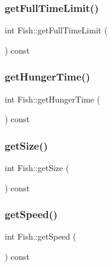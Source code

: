 \mbox{\label{class_fish_a40a7508eeee947749bc76e67eeca01cc}} 
\subsubsection{\texorpdfstring{get\+Full\+Time\+Limit()}{getFullTimeLimit()}}
{\footnotesize\ttfamily int Fish\+::get\+Full\+Time\+Limit (\begin{DoxyParamCaption}{ }\end{DoxyParamCaption}) const}

\mbox{\label{class_fish_aca713642313f9c438e900235c0c727d6}} 
\subsubsection{\texorpdfstring{get\+Hunger\+Time()}{getHungerTime()}}
{\footnotesize\ttfamily int Fish\+::get\+Hunger\+Time (\begin{DoxyParamCaption}{ }\end{DoxyParamCaption}) const}

\mbox{\label{class_fish_a00b7df960ce799914b15b0e95ecfa4c8}} 
\subsubsection{\texorpdfstring{get\+Size()}{getSize()}}
{\footnotesize\ttfamily int Fish\+::get\+Size (\begin{DoxyParamCaption}{ }\end{DoxyParamCaption}) const}

\mbox{\label{class_fish_af495566d33b8e3b83605a8222bc02783}} 
\subsubsection{\texorpdfstring{get\+Speed()}{getSpeed()}}
{\footnotesize\ttfamily int Fish\+::get\+Speed (\begin{DoxyParamCaption}{ }\end{DoxyParamCaption}) const}


